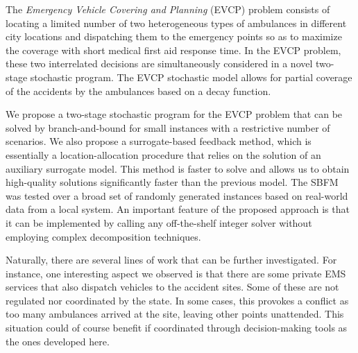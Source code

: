 The \textit{Emergency Vehicle Covering and Planning} (EVCP) problem consists
of locating a limited number of two heterogeneous types of ambulances in different city locations and dispatching them to the emergency points so as to maximize the coverage with short medical first aid response time. In the EVCP problem, these two interrelated decisions are simultaneously considered in a novel two-stage stochastic program. The EVCP stochastic model allows for partial coverage of the accidents by the ambulances based on a decay function.

 

We propose a two-stage stochastic program for the EVCP problem that can be solved by branch-and-bound for small instances with a restrictive number of scenarios. We also propose a surrogate-based feedback method, which is essentially a location-allocation procedure that relies on the solution of an auxiliary surrogate model. This method is faster to solve and allows us to obtain high-quality solutions significantly faster than the previous model. The SBFM was tested over a broad set of randomly generated instances based on real-world data from a local system.
An important feature of the proposed 
approach is that it can be implemented by calling any off-the-shelf integer solver without employing complex decomposition techniques.


  Naturally, there are several lines of work that can be further investigated.
For instance, one interesting aspect we observed is that
there are some private EMS services that also dispatch vehicles
to the accident sites.  Some of these are not regulated
nor coordinated by the state.  In some cases, this
provokes a conflict as too many ambulances arrived at the site, leaving other points unattended.  This situation could of course benefit if coordinated through decision-making tools as the ones developed here.


